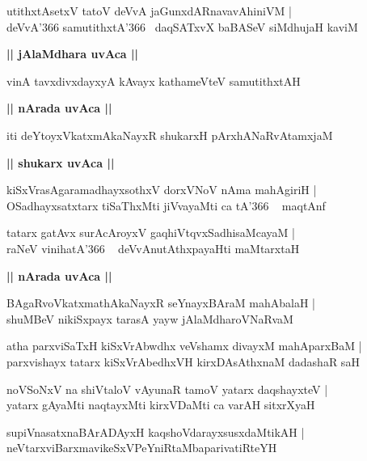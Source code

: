 \documentclass[twoside,12pt,openright]{book}
\newcounter{shloka}[chapter]
\def\uvaca#1{\centerline{{\large\textbf{#1}}}}
\begin{document}
\begin{shloka}%
utithxtAsetxV tatoV deVvA jaGunxdARnavavAhiniVM |\\
deVvA\char'366 samutithxtA\char'366 ~daqSATxvX baBASeV siMdhujaH kaviM
\end{shloka}

\uvaca{|| jAlaMdhara uvAca ||}

\begin{shloka}%
vinA tavxdivxdayxyA kAvayx kathameVteV samutithxtAH 
\end{shloka}

\uvaca{|| nArada uvAca ||}

\begin{shloka}%
iti deYtoyxVkatxmAkaNayxR shukarxH pArxhANaRvAtamxjaM 
\end{shloka}

\uvaca{|| shukarx uvAca ||}

\begin{shloka}%
kiSxVrasAgaramadhayxsothxV dorxVNoV nAma mahAgiriH |\\
OSadhayxsatxtarx tiSaThxMti jiVvayaMti ca tA\char'366 ~ maqtAnf 
\end{shloka}

\begin{shloka}%
tatarx gatAvx surAcAroyxV gaqhiVtqvxSadhisaMcayaM |\\
raNeV vinihatA\char'366 ~ deVvAnutAthxpayaHti maMtarxtaH 
\end{shloka}

\uvaca{|| nArada uvAca ||}

\begin{shloka}%
BAgaRvoVkatxmathAkaNayxR seYnayxBAraM mahAbalaH |\\
shuMBeV nikiSxpayx tarasA yayw jAlaMdharoVNaRvaM 
\end{shloka}

\begin{shloka}%
atha parxviSaTxH kiSxVrAbwdhx veVshamx divayxM mahAparxBaM |\\
parxvishayx tatarx kiSxVrAbedhxVH kirxDAsAthxnaM dadashaR saH 
\end{shloka}

\begin{shloka}%
noVSoNxV na shiVtaloV vAyunaR tamoV yatarx daqshayxteV |\\
yatarx gAyaMti naqtayxMti kirxVDaMti ca varAH sitxrXyaH 
\end{shloka}

\begin{shloka}%
supiVnasatxnaBArADAyxH kaqshoVdarayxsusxdaMtikAH |\\
neVtarxviBarxmavikeSxVPeYniRtaMbaparivatiRteYH
\end{shloka}
\end{document}
